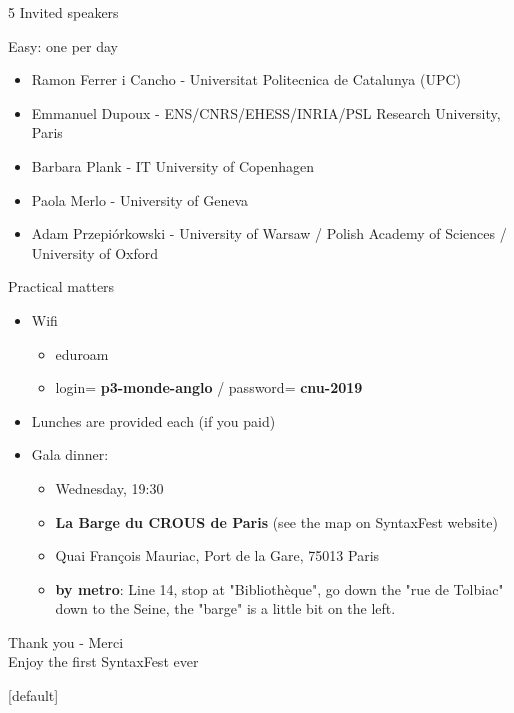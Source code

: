 \documentclass{beamer}
\begin{document}
\begin{frame}{5 Invited speakers}

Easy: one per day
\begin{itemize}

\item    Ramon Ferrer i Cancho - Universitat Politecnica de Catalunya (UPC)
\item     Emmanuel Dupoux - ENS/CNRS/EHESS/INRIA/PSL Research University, Paris
\item    Barbara Plank - IT University of Copenhagen
\item    Paola Merlo - University of Geneva
\item     Adam Przepiórkowski - University of Warsaw / Polish Academy of Sciences / University of Oxford

\end{itemize}

\end{frame}

\begin{frame}{Practical matters}
\begin{itemize}
\item Wifi
\begin{itemize}
\item eduroam
\item login= {\bf p3-monde-anglo} / password= {\bf cnu-2019}
\end{itemize}

\item Lunches are provided each (if you paid)
\item Gala dinner:
\begin{itemize}
\item Wednesday, 19:30
\item {\bf La Barge du CROUS de Paris} (see the map on SyntaxFest website)
\item Quai François Mauriac, Port de la Gare, 75013 Paris
\item {\bf by metro}: Line 14, stop at "Bibliothèque", go down the "rue de Tolbiac" down to the Seine, the "barge" is a little bit on the left. 
\end{itemize}
\end{itemize}
\end{frame}



\begin{frame}{}
Thank you - Merci\\
Enjoy the first SyntaxFest ever
\end{frame}





\setcounter{lastframe}{\insertframenumber}
[default]  %



\setcounter{framenumber}{\thelastframe}
\end{document}
